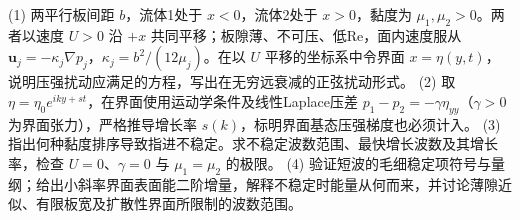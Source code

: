 (1) 两平行板间距 \(b\)，流体1处于 \(x<0\)，流体2处于 \(x>0\)，黏度为 \(\mu_1,\mu_2>0\)。两者以速度 \(U>0\) 沿 \(+x\) 共同平移；板隙薄、不可压、低Re，面内速度服从 \(\boldsymbol u_j=-\kappa_j\nabla p_j\)，\(\kappa_j=b^2/(12\mu_j)\)。在以 \(U\) 平移的坐标系中令界面 \(x=\eta(y,t)\)，说明压强扰动应满足的方程，写出在无穷远衰减的正弦扰动形式。
(2) 取 \(\eta=\eta_0e^{iky+st}\)，在界面使用运动学条件及线性Laplace压差 \(p_1-p_2=-\gamma\eta_{yy}\)（\(\gamma>0\) 为界面张力），严格推导增长率 \(s(k)\)，标明界面基态压强梯度也必须计入。
(3) 指出何种黏度排序导致指进不稳定。求不稳定波数范围、最快增长波数及其增长率，检查 \(U=0\)、\(\gamma=0\) 与 \(\mu_1=\mu_2\) 的极限。
(4) 验证短波的毛细稳定项符号与量纲；给出小斜率界面表面能二阶增量，解释不稳定时能量从何而来，并讨论薄隙近似、有限板宽及扩散性界面所限制的波数范围。
